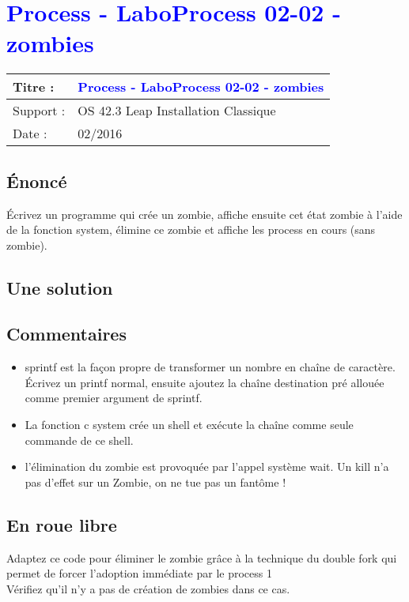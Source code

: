 \renewcommand{\titre}{\textcolor{blue}{ Process - LaboProcess 02-02 - zombies }}

\lhead{ \titre }
\section{{\titre} }

\begin{tabular}{|l|l|}
\hline
Titre : 	& \titre \\\hline
Support : 	& OS 42.3 Leap Installation Classique \\\hline
Date :		& 02/2016 \\\hline
\end{tabular}

\subsection{Énoncé}

Écrivez un programme qui crée un zombie, affiche ensuite cet état zombie à l'aide de la fonction system, élimine ce zombie et affiche les process en cours (sans zombie).

\subsection{Une solution}



\subsection{Commentaires}

\begin{itemize}
\item sprintf est la façon propre de transformer un nombre en chaîne de caractère. Écrivez un printf normal, ensuite ajoutez la chaîne destination pré allouée comme premier argument de sprintf.
\item La fonction c system crée un shell et exécute la chaîne comme seule commande de ce shell.
\item l'élimination du zombie est provoquée par l'appel système wait. Un kill n'a pas d'effet sur un Zombie, on ne tue pas un fantôme !
\end{itemize}

\subsection{En roue libre}
Adaptez ce code pour éliminer le zombie grâce à la technique du double fork qui permet de forcer l'adoption immédiate par le process 1\\
Vérifiez qu'il n'y a pas de création de zombies dans ce cas.
\newpage

